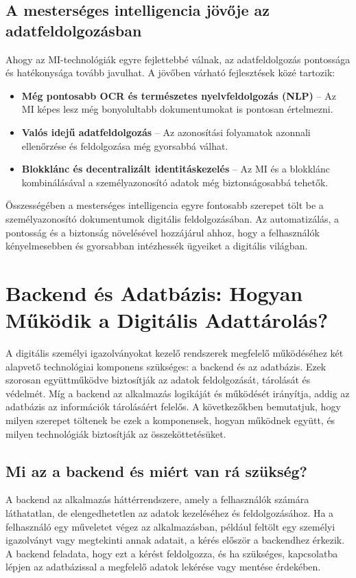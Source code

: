 \documentclass[
]{thesis-ekf}
\theoremstyle{definition}
\theoremstyle{remark}
\begin{document}
	\section{A mesterséges intelligencia jövője az adatfeldolgozásban}
	Ahogy az MI-technológiák egyre fejlettebbé válnak, az adatfeldolgozás pontossága és hatékonysága tovább javulhat. A jövőben várható fejlesztések közé tartozik:
	\begin{itemize}
		\item \textbf{Még pontosabb OCR és természetes nyelvfeldolgozás (NLP)} -- Az MI képes lesz még bonyolultabb dokumentumokat is pontosan értelmezni.
		\item \textbf{Valós idejű adatfeldolgozás} -- Az azonosítási folyamatok azonnali ellenőrzése és feldolgozása még gyorsabbá válhat.
		\item \textbf{Blokklánc és decentralizált identitáskezelés} -- Az MI és a blokklánc kombinálásával a személyazonosító adatok még biztonságosabbá tehetők.
	\end{itemize}
	Összességében a mesterséges intelligencia egyre fontosabb szerepet tölt be a személyazonosító dokumentumok digitális feldolgozásában. Az automatizálás, a pontosság és a biztonság növelésével hozzájárul ahhoz, hogy a felhasználók kényelmesebben és gyorsabban intézhessék ügyeiket a digitális világban.
	
	\chapter{Backend és Adatbázis: Hogyan Működik a Digitális Adattárolás?}
	A digitális személyi igazolványokat kezelő rendszerek megfelelő működéséhez két alapvető technológiai komponens szükséges: a backend és az adatbázis. Ezek szorosan együttműködve biztosítják az adatok feldolgozását, tárolását és védelmét. Míg a backend az alkalmazás logikáját és működését irányítja, addig az adatbázis az információk tárolásáért felelős. A következőkben bemutatjuk, hogy milyen szerepet töltenek be ezek a komponensek, hogyan működnek együtt, és milyen technológiák biztosítják az összeköttetésüket.
	
	\section{Mi az a backend és miért van rá szükség?}
	A backend az alkalmazás háttérrendszere, amely a felhasználók számára láthatatlan, de elengedhetetlen az adatok kezeléséhez és feldolgozásához. Ha a felhasználó egy műveletet végez az alkalmazásban, például feltölt egy személyi igazolványt vagy megtekinti annak adatait, a kérés először a backendhez érkezik. A backend feladata, hogy ezt a kérést feldolgozza, és ha szükséges, kapcsolatba lépjen az adatbázissal a megfelelő adatok lekérése vagy mentése érdekében.
	
\end{document}
